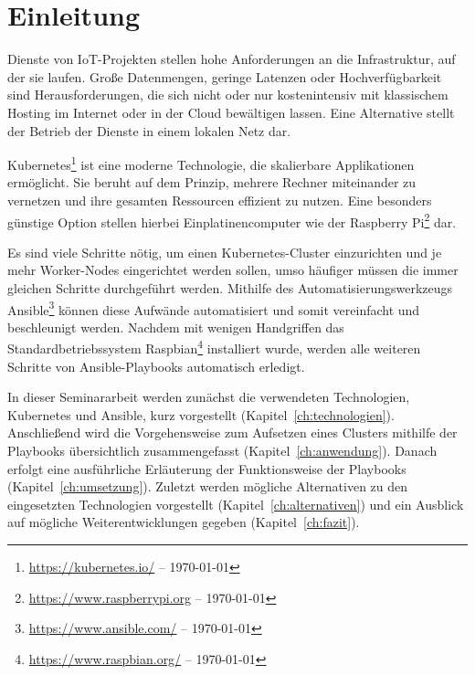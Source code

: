 \chapter{Einleitung}\label{ch:einleitung}

Dienste von IoT-Projekten stellen hohe Anforderungen an die Infrastruktur, auf der sie laufen.
Große Datenmengen, geringe Latenzen oder Hochverfügbarkeit sind Herausforderungen, die sich nicht oder nur kostenintensiv mit klassischem Hosting im Internet oder in der Cloud bewältigen lassen.
Eine Alternative stellt der Betrieb der Dienste in einem lokalen Netz dar.

Kubernetes\footnote{\url{https://kubernetes.io/} -- \today} ist eine moderne Technologie, die skalierbare Applikationen ermöglicht.
Sie beruht auf dem Prinzip, mehrere Rechner miteinander zu vernetzen und ihre gesamten Ressourcen effizient zu nutzen.
Eine besonders günstige Option stellen hierbei Einplatinencomputer wie der Raspberry Pi\footnote{\url{https://www.raspberrypi.org} -- \today} dar.

Es sind viele Schritte nötig, um einen Kubernetes-Cluster einzurichten und je mehr Worker-Nodes eingerichtet werden sollen, umso häufiger müssen die immer gleichen Schritte durchgeführt werden.
Mithilfe des Automatisierungswerkzeugs Ansible\footnote{\url{https://www.ansible.com/} -- \today} können diese Aufwände automatisiert und somit vereinfacht und beschleunigt werden.
Nachdem mit wenigen Handgriffen das Standardbetriebssystem Raspbian\footnote{\url{https://www.raspbian.org/} -- \today} installiert wurde, werden alle weiteren Schritte von Ansible-Playbooks automatisch erledigt.

In dieser Seminararbeit werden zunächst die verwendeten Technologien, Kubernetes und Ansible, kurz vorgestellt (Kapitel~\ref{ch:technologien}).
Anschließend wird die Vorgehensweise zum Aufsetzen eines Clusters mithilfe der Playbooks übersichtlich zusammengefasst (Kapitel~\ref{ch:anwendung}).
Danach erfolgt eine ausführliche Erläuterung der Funktionsweise der Playbooks (Kapitel~\ref{ch:umsetzung}).
Zuletzt werden mögliche Alternativen zu den eingesetzten Technologien vorgestellt (Kapitel~\ref{ch:alternativen}) und ein Ausblick auf mögliche Weiterentwicklungen gegeben (Kapitel~\ref{ch:fazit}).
